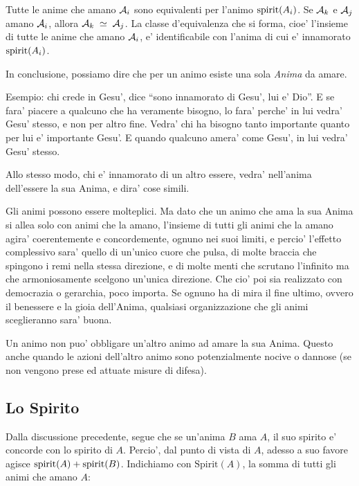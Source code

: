 Tutte le anime che amano $\mathcal{A}_i$ sono equivalenti per l'animo $\textrm{spirit}(A_i)$. Se $\mathcal{A}_k$ e $\mathcal{A}_j$ amano $\mathcal{A}_i$, allora ${\mathcal{A}_k\;\simeq\;\mathcal{A}_j}$. La classe d'equivalenza che si forma, cioe' l'insieme di tutte le anime che amano $\mathcal{A}_i$, e' identificabile con l'anima di cui e' innamorato $\textrm{spirit}(A_i)$.

In conclusione, possiamo dire che per un animo esiste una sola \emph{Anima} da amare.

Esempio: chi crede in Gesu', dice ``sono innamorato di Gesu', lui e' Dio''. E se fara' piacere a qualcuno che ha veramente bisogno, lo fara' perche' in lui vedra' Gesu' stesso, e non per altro fine. Vedra' chi ha bisogno tanto importante quanto per lui e' importante Gesu'. E quando qualcuno amera' come Gesu', in lui vedra' Gesu' stesso.

Allo stesso modo, chi e' innamorato di un altro essere, vedra' nell'anima dell'essere la sua Anima, e dira' cose simili.

Gli animi possono essere molteplici. Ma dato che un animo che ama la sua Anima si allea solo con animi che la amano, l'insieme di tutti gli animi che la amano agira' coerentemente e concordemente, ognuno nei suoi limiti, e percio' l'effetto complessivo sara' quello di un'unico cuore che pulsa, di molte braccia che spingono i remi nella stessa direzione, e di molte menti che scrutano l'infinito ma che armoniosamente scelgono un'unica direzione. Che cio' poi sia realizzato con democrazia o gerarchia, poco importa. Se ognuno ha di mira il fine ultimo, ovvero il benessere e la gioia dell'Anima, qualsiasi organizzazione che gli animi sceglieranno sara' buona.

Un animo non puo' obbligare un'altro animo ad amare la sua Anima. Questo anche quando le azioni dell'altro animo sono potenzialmente nocive o dannose (se non vengono prese ed attuate misure di difesa).


\def\Dio{D}

\subsection{Lo Spirito}

\def\Spirit#1{\textrm{Spirit}(#1)}

Dalla discussione precedente, segue che se un'anima $B$ ama $A$, il suo spirito e' concorde con lo spirito di $A$. Percio', dal punto di vista di $A$, adesso a suo favore agisce $\textrm{spirit}(A)+\textrm{spirit}(B)$. Indichiamo con $\Spirit{A}$, la somma di tutti gli animi che amano $A$:

